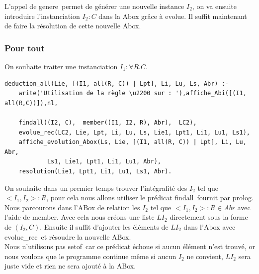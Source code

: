\documentclass{article}
\begin{document}
L'appel de \color{blue}genere\color{black}\ permet de générer une nouvelle instance $I_2$, on va ensuite introduire l'instanciation $I_2:C$ dans la Abox grâce à \color{blue}evolue\color{black}. Il suffit maintenant de faire la résolution de cette nouvelle Abox.

\subsubsection{Pour tout}

On souhaite traiter une instanciation $I_1:\forall R.C$.
\begin{verbatim}
deduction_all(Lie, [(I1, all(R, C)) | Lpt], Li, Lu, Ls, Abr) :-
	write('Utilisation de la règle \u2200 sur : '),affiche_Abi([(I1, all(R,C))]),nl,
 
	findall((I2, C),  member((I1, I2, R), Abr),  LC2), 
	evolue_rec(LC2, Lie, Lpt, Li, Lu, Ls, Lie1, Lpt1, Li1, Lu1, Ls1),
	affiche_evolution_Abox(Ls, Lie, [(I1, all(R, C)) | Lpt], Li, Lu, Abr,
            Ls1, Lie1, Lpt1, Li1, Lu1, Abr), 
	resolution(Lie1, Lpt1, Li1, Lu1, Ls1, Abr).
\end{verbatim}

On souhaite dans un premier temps trouver l'intégralité des $I_2$ tel que $<I_1,I_2>:R$, pour cela nous allons utiliser le prédicat \color{blue}findall\color{black}\ fournit par prolog. Nous parcourons dans l'ABox de relation les $I_2$ tel que $<I_1,I_2>:R\in Abr$ avec l'aide de \color{blue}member\color{black}. Avec cela nous créons une liste $LI_2$ directement sous la forme de $(I_2,C)$. Ensuite il suffit d'ajouter les éléments de $LI_2$ dans l'Abox avec \color{blue}evolue\_rec\color{black}\ et résoudre la nouvelle ABox.\\

Nous n'utilisons pas \color{blue}setof\color{black}\ car ce prédicat échoue si aucun élément n'est trouvé, or nous voulons que le programme continue même si aucun $I_2$ ne convient, $LI_2$ sera juste vide et rien ne sera ajouté à la ABox.
\end{document}
